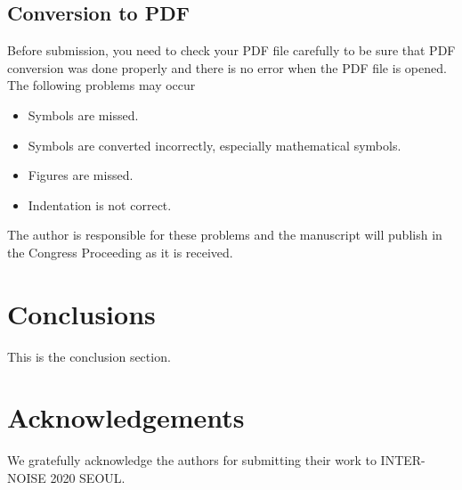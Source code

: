 \subsection{Conversion to PDF}

Before submission, you need to check your PDF file carefully to be sure that PDF conversion was
done properly and there is no error when the PDF file is opened. 
The following problems may occur

\begin{itemize}
\item Symbols are missed.
\item Symbols are converted incorrectly, especially mathematical symbols.
\item Figures are missed.
\item Indentation is not correct.
\end{itemize}

The author is responsible for these problems and the manuscript will publish in the Congress Proceeding as it is received.

\section{Conclusions}

This is the conclusion section.

\section{Acknowledgements}

We  gratefully acknowledge the authors for submitting their work to INTER-NOISE 2020 SEOUL.

